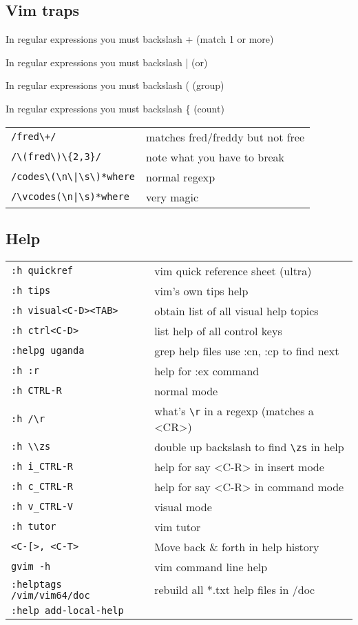 \subsection{Vim traps}
\begin{list}{}
    \item In regular expressions you must backslash + (match 1 or more)
    \item In regular expressions you must backslash | (or)
    \item In regular expressions you must backslash ( (group)
    \item In regular expressions you must backslash \{ (count)
\end{list}

\begin{center}
\begin{longtable}{l|l}
\verb!/fred\+/! & matches fred/freddy but not free\\
\verb!/\(fred\)\{2,3}/! & note what you have to break\\
\verb!/codes\(\n\|\s\)*where! & normal regexp\\
\verb!/\vcodes(\n|\s)*where! & very magic
\end{longtable}
\end{center}

\subsection{Help}
\begin{center}
\begin{longtable}{l|l}
 \verb!:h quickref! & vim quick reference sheet (ultra)\\
 \verb!:h tips! & vim's own tips help\\
 \verb!:h visual<C-D><TAB>! & obtain list of all visual help topics\\
 \verb!:h ctrl<C-D>! & list help of all control keys\\
 \verb!:helpg uganda! & grep help files use :cn, :cp to find next\\
 \verb!:h :r! & help for :ex command\\
 \verb!:h CTRL-R! & normal mode\\
 \verb!:h /\r! & what's \verb!\r! in a regexp (matches a <CR>)\\
 \verb!:h \\zs! & double up backslash to find \verb!\zs! in help\\
 \verb!:h i_CTRL-R! & help for say <C-R> in insert mode\\
 \verb!:h c_CTRL-R! & help for say <C-R> in command mode\\
 \verb!:h v_CTRL-V! & visual mode\\
 \verb!:h tutor! & vim tutor\\
 \verb!<C-[>, <C-T>! & Move back \& forth in help history\\
 \verb!gvim -h! & vim command line help\\
 \verb!:helptags /vim/vim64/doc! & rebuild all *.txt help files in /doc\\
 \verb!:help add-local-help! &
\end{longtable}
\end{center}
